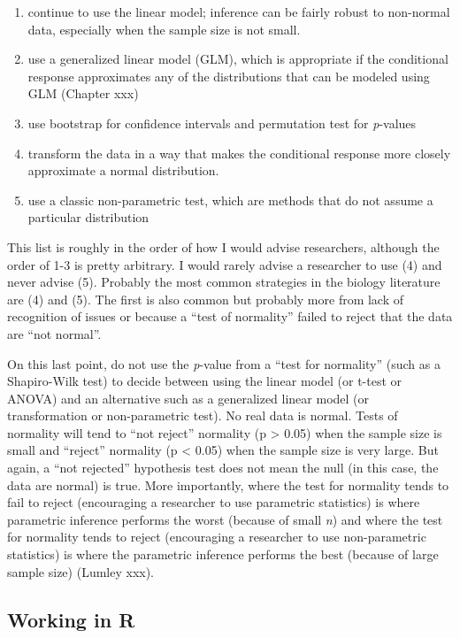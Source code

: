 \documentclass[]{book}
\providecommand{\tightlist}{%
  \setlength{\itemsep}{0pt}\setlength{\parskip}{0pt}}
\begin{document}
\begin{enumerate}
\def\labelenumi{\arabic{enumi}.}
\tightlist
\item
  continue to use the linear model; inference can be fairly robust to non-normal data, especially when the sample size is not small.
\item
  use a generalized linear model (GLM), which is appropriate if the conditional response approximates any of the distributions that can be modeled using GLM (Chapter xxx)
\item
  use bootstrap for confidence intervals and permutation test for \emph{p}-values
\item
  transform the data in a way that makes the conditional response more closely approximate a normal distribution.
\item
  use a classic non-parametric test, which are methods that do not assume a particular distribution
\end{enumerate}

This list is roughly in the order of how I would advise researchers, although the order of 1-3 is pretty arbitrary. I would rarely advise a researcher to use (4) and never advise (5). Probably the most common strategies in the biology literature are (4) and (5). The first is also common but probably more from lack of recognition of issues or because a ``test of normality'' failed to reject that the data are ``not normal''.

On this last point, do not use the \emph{p}-value from a ``test for normality'' (such as a Shapiro-Wilk test) to decide between using the linear model (or t-test or ANOVA) and an alternative such as a generalized linear model (or transformation or non-parametric test). No real data is normal. Tests of normality will tend to ``not reject'' normality (p \textgreater{} 0.05) when the sample size is small and ``reject'' normality (p \textless{} 0.05) when the sample size is very large. But again, a ``not rejected'' hypothesis test does not mean the null (in this case, the data are normal) is true. More importantly, where the test for normality tends to fail to reject (encouraging a researcher to use parametric statistics) is where parametric inference performs the worst (because of small \emph{n}) and where the test for normality tends to reject (encouraging a researcher to use non-parametric statistics) is where the parametric inference performs the best (because of large sample size) (Lumley xxx).

\hypertarget{working-in-r-3}{%
\subsection{Working in R}\label{working-in-r-3}}
\end{document}
